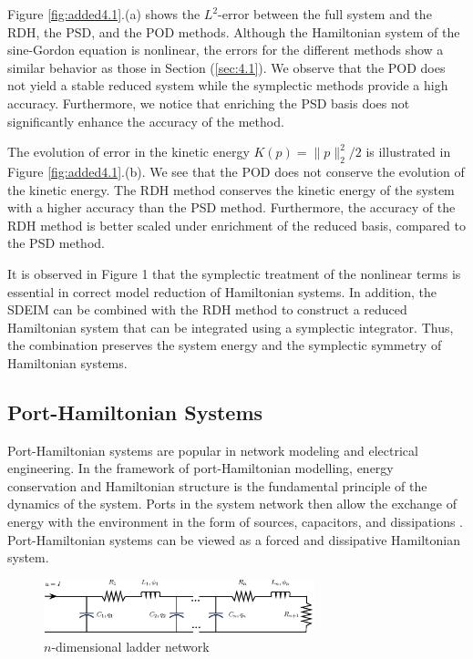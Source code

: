 Figure \ref{fig:added4.1}.(a) shows the $L^2$-error between the full system and the RDH, the PSD, and the POD methods. Although the Hamiltonian system of the sine-Gordon equation is nonlinear, the errors for the different methods show a similar behavior as those in Section (\ref{sec:4.1}). We observe that the POD does not yield a stable reduced system while the symplectic methods provide a high accuracy. Furthermore, we notice that enriching the PSD basis does not significantly enhance the accuracy of the method.

The evolution of error in the kinetic energy $K(p) = \|p\|_2^2/2$ is illustrated in Figure \ref{fig:added4.1}.(b). We see that the POD does not conserve the evolution of the kinetic energy. The RDH method conserves the kinetic energy of the system with a higher accuracy than the PSD method. Furthermore, the accuracy of the RDH method is better scaled under enrichment of the reduced basis, compared to the PSD method. 

It is observed in Figure 1 that the symplectic treatment of the nonlinear terms is essential in correct model reduction of Hamiltonian systems. In addition, the SDEIM can be combined with the RDH method to construct a reduced Hamiltonian system that can be integrated using a symplectic integrator. Thus, the combination preserves the system energy and the symplectic symmetry of Hamiltonian systems.

\subsection{Port-Hamiltonian Systems}
Port-Hamiltonian systems are popular in network modeling and electrical engineering. In the framework of port-Hamiltonian modelling, energy conservation and Hamiltonian structure is the fundamental principle of the dynamics of the system. Ports in the system network then allow the exchange of energy with the environment in the form of sources, capacitors, and dissipations \cite{vanderSchaft:2014:PST:2693645.2693646}. Port-Hamiltonian systems can be viewed as a forced and dissipative Hamiltonian system.
\begin{figure}[t]
\begin{center}
	\includegraphics[width=0.7\textwidth]{./images/paper3/porthamil/circuit}
\end{center}
\caption{$n$-dimensional ladder network} \label{fig:4.2}
\end{figure}

